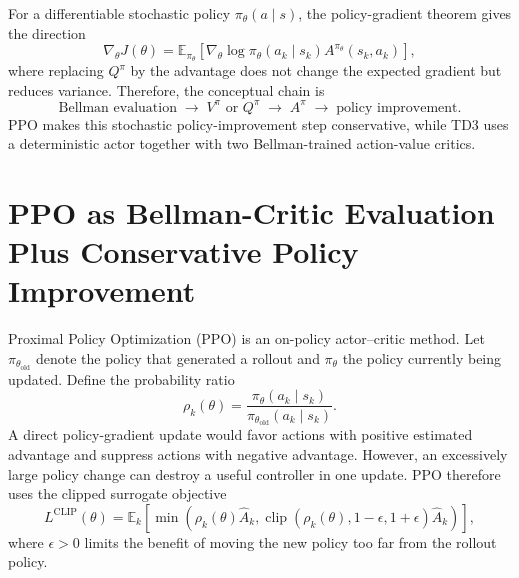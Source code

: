\documentclass[11pt]{article}
\begin{document}
For a differentiable stochastic policy $\pi_{\theta}(a\mid s)$, the policy-gradient theorem gives the direction
\begin{equation}
\nabla_{\theta}J(\theta)
=
\mathbb{E}_{\pi_{\theta}}
\left[
\nabla_{\theta}\log\pi_{\theta}(a_k\mid s_k)
A^{\pi_{\theta}}(s_k,a_k)
\right],
\label{eq:policy_gradient}
\end{equation}
where replacing $Q^{\pi}$ by the advantage does not change the expected gradient but reduces variance. Therefore, the conceptual chain is
\[
\text{Bellman evaluation}
\;\longrightarrow\;
V^{\pi}\text{ or }Q^{\pi}
\;\longrightarrow\;
A^{\pi}
\;\longrightarrow\;
\text{policy improvement}.
\]
PPO makes this stochastic policy-improvement step conservative, while TD3 uses a deterministic actor together with two Bellman-trained action-value critics.

\section{PPO as Bellman-Critic Evaluation Plus Conservative Policy Improvement}

Proximal Policy Optimization (PPO) \cite{schulman2017ppo} is an on-policy actor--critic method. Let $\pi_{\theta_{\mathrm{old}}}$ denote the policy that generated a rollout and $\pi_{\theta}$ the policy currently being updated. Define the probability ratio
\begin{equation}
\rho_k(\theta)
=
\frac{\pi_{\theta}(a_k\mid s_k)}
{\pi_{\theta_{\mathrm{old}}}(a_k\mid s_k)}.
\label{eq:ppo_ratio}
\end{equation}
A direct policy-gradient update would favor actions with positive estimated advantage and suppress actions with negative advantage. However, an excessively large policy change can destroy a useful controller in one update. PPO therefore uses the clipped surrogate objective
\begin{equation}
L^{\mathrm{CLIP}}(\theta)
=
\mathbb{E}_k
\left[
\min\!\left(
\rho_k(\theta)\widehat{A}_k,
\operatorname{clip}(\rho_k(\theta),1-\epsilon,1+\epsilon)\widehat{A}_k
\right)
\right],
\label{eq:ppo_clip}
\end{equation}
where $\epsilon>0$ limits the benefit of moving the new policy too far from the rollout policy.
\end{document}
